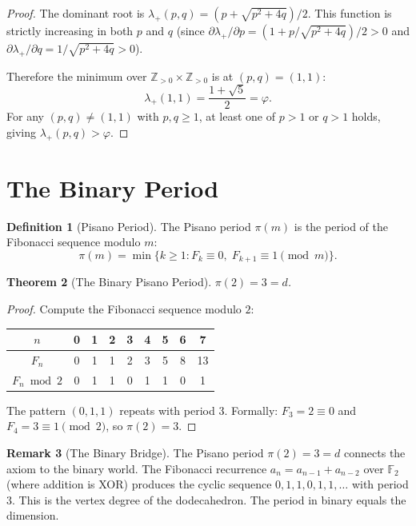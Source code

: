 \documentclass[11pt,a4paper]{article}
\theoremstyle{plain}
\newtheorem{theorem}{Theorem}[section]
\theoremstyle{definition}
\newtheorem{definition}[theorem]{Definition}
\newtheorem{remark}[theorem]{Remark}
\newcommand{\Z}{\mathbb{Z}}
\newcommand{\F}{\mathbb{F}}
\newcommand{\vp}{\varphi}
\begin{document}
\begin{proof}
The dominant root is $\lambda_{+}(p,q) = (p + \sqrt{p^{2} + 4q})/2$.
This function is strictly increasing in both $p$ and $q$
(since $\partial\lambda_{+}/\partial p = (1 + p/\sqrt{p^{2}+4q})/2 > 0$
and $\partial\lambda_{+}/\partial q = 1/\sqrt{p^{2}+4q} > 0$).

Therefore the minimum over $\Z_{>0} \times \Z_{>0}$ is at
$(p,q) = (1,1)$:
\[
  \lambda_{+}(1,1) = \frac{1 + \sqrt{5}}{2} = \vp.
\]
For any $(p,q) \ne (1,1)$ with $p, q \ge 1$, at least one of
$p > 1$ or $q > 1$ holds, giving $\lambda_{+}(p,q) > \vp$.
\end{proof}

\section{The Binary Period}\label{sec:binary}

\begin{definition}[Pisano Period]\label{def:pisano}
The Pisano period $\pi(m)$ is the period of the Fibonacci sequence
modulo $m$:
\begin{equation}\label{eq:pisano}
  \pi(m) = \min\{k \ge 1 : F_{k} \equiv 0,\; F_{k+1} \equiv 1 \pmod{m}\}.
\end{equation}
\end{definition}

\begin{theorem}[The Binary Pisano Period]\label{thm:pisano-2}
$\pi(2) = 3 = d$.
\end{theorem}

\begin{proof}
Compute the Fibonacci sequence modulo $2$:
\begin{center}
\begin{tabular}{c|cccccccc}
$n$ & 0 & 1 & 2 & 3 & 4 & 5 & 6 & 7 \\
\hline
$F_{n}$ & 0 & 1 & 1 & 2 & 3 & 5 & 8 & 13 \\
$F_{n} \bmod 2$ & 0 & 1 & 1 & 0 & 1 & 1 & 0 & 1
\end{tabular}
\end{center}
The pattern $(0, 1, 1)$ repeats with period $3$.  Formally:
$F_{3} = 2 \equiv 0$ and $F_{4} = 3 \equiv 1 \pmod{2}$, so $\pi(2) = 3$.
\end{proof}

\begin{remark}[The Binary Bridge]\label{rem:binary-bridge}
The Pisano period $\pi(2) = 3 = d$ connects the axiom to the binary
world.  The Fibonacci recurrence $a_{n} = a_{n-1} + a_{n-2}$ over
$\F_{2}$ (where addition is XOR) produces the cyclic sequence
$0, 1, 1, 0, 1, 1, \ldots$ with period $3$.  This is the vertex
degree of the dodecahedron.  The period in binary equals the
dimension.
\end{remark}
\end{document}
